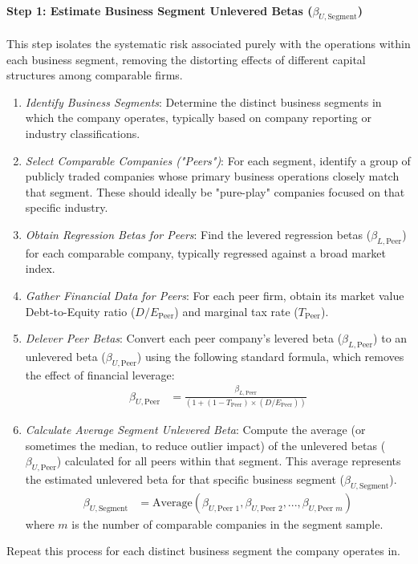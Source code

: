 \paragraph{Step 1: Estimate Business Segment Unlevered Betas (\(\beta_{U, \text{Segment}}\))}
This step isolates the systematic risk associated purely with the operations within each business segment, removing the distorting effects of different capital structures among comparable firms.
\begin{enumerate}
    \item \textit{Identify Business Segments}: Determine the distinct business segments in which the company operates, typically based on company reporting or industry classifications.
    \item \textit{Select Comparable Companies ("Peers")}: For each segment, identify a group of publicly traded companies whose primary business operations closely match that segment. These should ideally be "pure-play" companies focused on that specific industry.
    \item \textit{Obtain Regression Betas for Peers}: Find the levered regression betas (\(\beta_{L, \text{Peer}}\)) for each comparable company, typically regressed against a broad market index.
    \item \textit{Gather Financial Data for Peers}: For each peer firm, obtain its market value Debt-to-Equity ratio (\(D/E_{\text{Peer}}\)) and marginal tax rate (\(T_{\text{Peer}}\)).
    \item \textit{Delever Peer Betas}: Convert each peer company's levered beta (\(\beta_{L, \text{Peer}}\)) to an unlevered beta (\(\beta_{U, \text{Peer}}\)) using the following standard formula, which removes the effect of financial leverage:
          \begin{align*}
              \beta_{U, \text{Peer}} & = \frac{\beta_{L, \text{Peer}}}{(1 + (1 - T_{\text{Peer}}) \times (D/E_{\text{Peer}}))}
          \end{align*}
    \item \textit{Calculate Average Segment Unlevered Beta}: Compute the average (or sometimes the median, to reduce outlier impact) of the unlevered betas (\(\beta_{U, \text{Peer}}\)) calculated for all peers within that segment. This average represents the estimated unlevered beta for that specific business segment (\(\beta_{U, \text{Segment}}\)).
          \begin{align*}
              \beta_{U, \text{Segment}} & = \text{Average}(\beta_{U, \text{Peer } 1}, \beta_{U, \text{Peer } 2}, ..., \beta_{U, \text{Peer } m})
          \end{align*}
          where \(m\) is the number of comparable companies in the segment sample.
\end{enumerate}
Repeat this process for each distinct business segment the company operates in.

